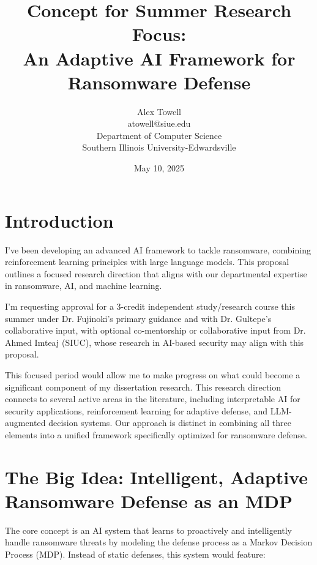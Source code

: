\documentclass[11pt]{article}
\title{\textbf{Concept for Summer Research Focus: \\ An Adaptive AI Framework for Ransomware Defense}}
\author{
    Alex Towell \\
    atowell@siue.edu \\
    Department of Computer Science \\
    Southern Illinois University-Edwardsville \\
}
\date{May 10, 2025}
\begin{document}
\maketitle



\section*{Introduction}

I've been developing an advanced AI framework to tackle ransomware, combining reinforcement learning principles with large language models. This proposal outlines a focused research direction that aligns with our departmental expertise in ransomware, AI, and machine learning. 


I'm requesting approval for a 3-credit independent study/research course this summer under Dr. Fujinoki's primary guidance and with Dr. Gultepe's collaborative input, with optional co-mentorship or collaborative input from Dr. Ahmed Imteaj (SIUC), whose research in AI-based security may align with this proposal.

This focused period would allow me to make progress on what could become a significant component of my dissertation research. This research direction connects to several active areas in the literature, including interpretable AI for security applications, reinforcement learning for adaptive defense, and LLM-augmented decision systems. Our approach is distinct in combining all three elements into a unified framework specifically optimized for ransomware defense.

\section*{The Big Idea: Intelligent, Adaptive Ransomware Defense as an MDP}

The core concept is an AI system that learns to proactively and intelligently handle ransomware threats by modeling the defense process as a Markov Decision Process (MDP). Instead of static defenses, this system would feature:
\end{document}
